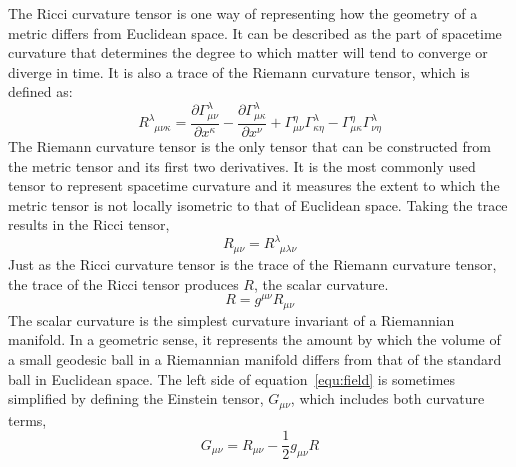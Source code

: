 The Ricci curvature tensor is one way of representing how the geometry of a metric differs from Euclidean space. It can be described as the part of spacetime curvature that determines the degree to which matter will tend to converge or diverge in time. It is also a trace of the Riemann curvature tensor, which is defined as:
\begin{equation}
\label{equ:riemann_curv_tensor}
    R^{\lambda}_{\;\;\mu\nu\kappa} = \frac{\partial \Gamma^{\lambda}_{\mu\nu}}{\partial x^{\kappa}} - \frac{\partial \Gamma^{\lambda}_{\mu\kappa}}{\partial x^{\nu}} + \Gamma^{\eta}_{\mu\nu}\Gamma^{\lambda}_{\kappa\eta} - \Gamma^{\eta}_{\mu\kappa}\Gamma^{\lambda}_{\nu\eta}
\end{equation}
The Riemann curvature tensor is the only tensor that can be constructed from the metric tensor and its first two derivatives. It is the most commonly used tensor to represent spacetime curvature and it measures the extent to which the metric tensor is not locally isometric to that of Euclidean space. Taking the trace results in the Ricci tensor,
\begin{equation}
    R_{\mu\nu} = R^{\lambda}_{\;\;\mu\lambda\nu}
\end{equation}
Just as the Ricci curvature tensor is the trace of the Riemann curvature tensor, the trace of the Ricci tensor produces $R$, the scalar curvature. 
\begin{equation}
    R = g^{\mu\nu}R_{\mu\nu}
\end{equation}
The scalar curvature is the simplest curvature invariant of a Riemannian manifold. In a geometric sense, it represents the amount by which the volume of a small geodesic ball in a Riemannian manifold differs from that of the standard ball in Euclidean space. The left side of equation~\ref{equ:field} is sometimes simplified by defining the Einstein tensor, $G_{\mu\nu}$, which includes both curvature terms,
\begin{equation}
    G_{\mu\nu} = R_{\mu\nu} - \frac{1}{2}g_{\mu\nu}R
\end{equation}

